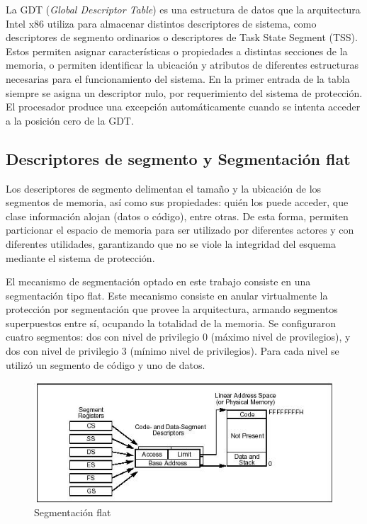	La GDT (\textit{Global Descriptor Table}) es una estructura de datos
que la arquitectura Intel x86 utiliza para almacenar distintos descriptores
de sistema, como descriptores de segmento ordinarios o descriptores de Task State 
Segment (TSS). Estos permiten asignar características o propiedades a distintas secciones de la memoria, 
o permiten identificar la ubicación y atributos de diferentes estructuras necesarias para el funcionamiento 
del sistema.
	En la primer entrada de la tabla siempre se asigna un descriptor nulo, por requerimiento del 
sistema de protección. El procesador produce una excepción automáticamente cuando se intenta acceder a la posición cero de la GDT.

\subsection{Descriptores de segmento y Segmentación flat}

	Los descriptores de segmento delimentan el tamaño y la ubicación de los segmentos de memoria, así como 
sus propiedades: quién los puede acceder, que clase información alojan (datos o código), entre otras. De esta forma, permiten particionar el espacio de memoria para ser utilizado por diferentes actores y con diferentes utilidades, garantizando que no se viole la integridad del esquema mediante el sistema de protección.

	El mecanismo de segmentación optado en este trabajo consiste en una segmentación tipo flat.
Este mecanismo consiste en anular virtualmente la protección por segmentación que provee la arquitectura, armando segmentos superpuestos entre sí, ocupando la totalidad de la memoria. Se configuraron cuatro segmentos: dos con nivel de privilegio 0 (máximo nivel de provilegios), y dos con nivel de privilegio
3 (mínimo nivel de privilegios). Para cada nivel se utilizó un segmento de código y uno
de datos.

\begin{figure}[h]
\begin{center}
  \includegraphics[scale=3.0]{secciones/dibujitos/modelo_flat.jpg}
\end{center}
\caption{Segmentación flat}
\end{figure}

